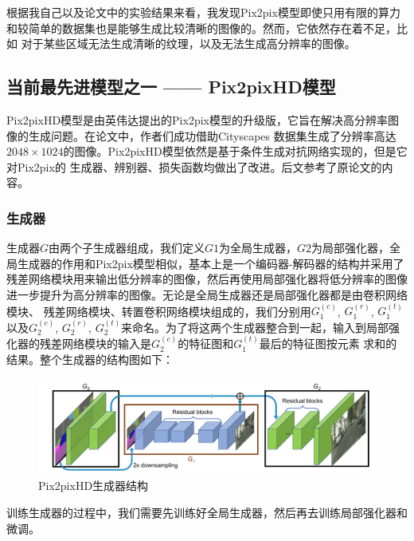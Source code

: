 \documentclass[supercite]{HustGraduPaper}
\theoremstyle{definition}
\begin{document}
根据我自己以及论文中的实验结果来看，我发现Pix2pix模型即使只用有限的算力和较简单的数据集也是能够生成比较清晰的图像的。然而，它依然存在着不足，比如
对于某些区域无法生成清晰的纹理，以及无法生成高分辨率的图像。

\subsection{当前最先进模型之一 —— Pix2pixHD模型}

Pix2pixHD模型是由英伟达提出的Pix2pix模型的升级版，它旨在解决高分辨率图像的生成问题。在论文\cite{wang2018pix2pixHD}中，作者们成功借助Cityscapes
数据集\cite{Cordts2016Cityscapes}生成了分辨率高达$2048\times1024$的图像。Pix2pixHD模型依然是基于条件生成对抗网络实现的，但是它对Pix2pix的
生成器、辨别器、损失函数均做出了改进。后文参考了原论文\cite{wang2018pix2pixHD}的内容。

\subsubsection{生成器}

生成器$G$由两个子生成器组成，我们定义$G1$为全局生成器，$G2$为局部强化器，全局生成器的作用和Pix2pix模型相似，基本上是一个编码器-解码器的结构并采用了
残差网络模块用来输出低分辨率的图像，然后再使用局部强化器将低分辨率的图像进一步提升为高分辨率的图像。无论是全局生成器还是局部强化器都是由卷积网络模块、
残差网络模块、转置卷积网络模块组成的，我们分别用$G_{1}^{(c)}$, $G_{1}^{(r)}$, $G_{1}^{(t)}$以及$G_{2}^{(c)}$, $G_{2}^{(r)}$, 
$G_{2}^{(t)}$来命名。为了将这两个生成器整合到一起，输入到局部强化器的残差网络模块的输入是$G_{2}^{(c)}$的特征图和$G_{1}^{(t)}$最后的特征图按元素
求和的结果。整个生成器的结构图如下：
\begin{figure}[H]
  \begin{center}
  \includegraphics[width=12cm]{images/pix2pixHD-generator}
  \end{center}
  \caption{Pix2pixHD生成器结构}
  \label{fig:pix2pixHD-generator}
\end{figure}

训练生成器的过程中，我们需要先训练好全局生成器，然后再去训练局部强化器和微调。
\end{document}
